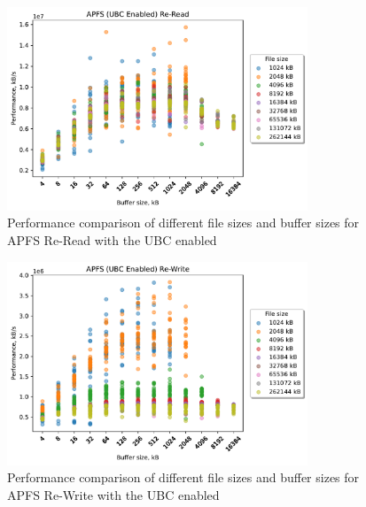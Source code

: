 \begin{figure}[!htb]
	\label{fig:bench_apfs_no_ubc_scatter_re-read}
	\begin{center}
		\includegraphics[width=0.8\textwidth]{figures.nosync/benchmarking/APFS/scatter-UBC Enabled-Re-Read.pdf}
	\end{center}
	\caption[Comparison of Re-Read performance for file size and buffer size of APFS with the UBC disabled]{Performance comparison of different file sizes and buffer sizes for APFS Re-Read with the UBC enabled}
\end{figure}
\begin{figure}[!htb]
	\label{fig:bench_apfs_no_ubc_scatter_re-write}
	\begin{center}
		\includegraphics[width=0.8\textwidth]{figures.nosync/benchmarking/APFS/scatter-UBC Enabled-Re-Write.pdf}
	\end{center}
	\caption[Comparison of Re-Write performance for file size and buffer size of APFS with the UBC disabled]{Performance comparison of different file sizes and buffer sizes for APFS Re-Write with the UBC enabled}
\end{figure}
\clearpage

